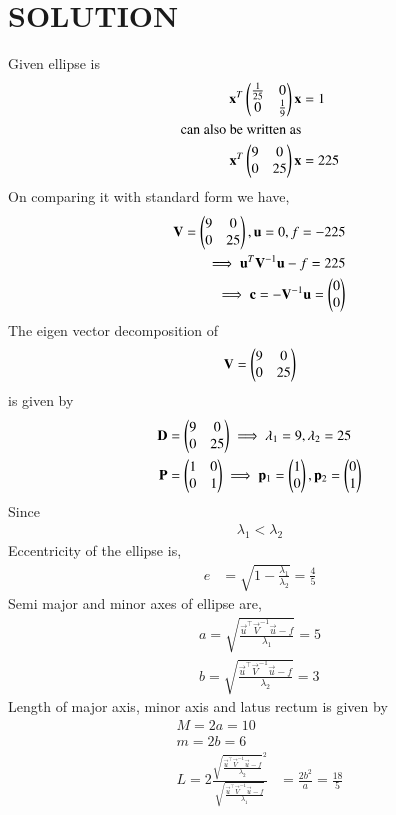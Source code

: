 \documentclass[journal,12pt,twocolumn]{IEEEtran}
\begin{document}
\section{SOLUTION}
%
Given ellipse is
\begin{align}
   \mathbf{x}^T\begin{pmatrix}\frac{1}{25}&0\\0&\frac{1}{9}\end{pmatrix}\mathbf{x}&=1\\
   \text{can also be written as}\\
   \mathbf{x}^T\begin{pmatrix}9&0\\0&25\end{pmatrix}\mathbf{x}&=225
\end{align}
%
On comparing it with standard form we have,
\begin{align}
    \mathbf{V}=\begin{pmatrix}9&0\\0&25\end{pmatrix},\mathbf{u}=0,f=-225\\
    \implies\mathbf{u}^T\mathbf{V}^{-1}\mathbf{u}-f = 225\\
    \implies\mathbf{c} = -\mathbf{V}^{-1}\mathbf{u} = \begin{pmatrix}0\\0\end{pmatrix}\\
\end{align}
The eigen vector decomposition of 
\begin{align}
    \mathbf{V} = \begin{pmatrix}9&0\\0&25\end{pmatrix}
\end{align}
is given by
\begin{align}
    \mathbf{D} &= \begin{pmatrix}9&0\\0&25\end{pmatrix} \implies \lambda_1 = 9,\lambda_2 = 25\\
    \mathbf{P} &= \begin{pmatrix}1&0\\0&1\end{pmatrix}\implies \mathbf{p}_1 = \begin{pmatrix}1\\0\end{pmatrix}, \mathbf{p}_2 = \begin{pmatrix}0\\1\end{pmatrix}
\end{align}
Since
\begin{align}
   \lambda_1 < \lambda_2
\end{align}
Eccentricity of the ellipse is,
\begin{align}
   e &= \sqrt{1-\frac{\lambda_1}{\lambda_2}}
   = \frac{4}{5}
\end{align} 
Semi major and minor axes of ellipse are,
\begin{align}
    a = \sqrt{\frac{\vec{u}^{\top}\vec{V}^{-1}\vec{u}-f}{\lambda_1}} = 5\\
    b = \sqrt{\frac{\vec{u}^{\top}\vec{V}^{-1}\vec{u}-f}{\lambda_2}} = 3
\end{align}
Length of major axis, minor axis and latus rectum is given by
\begin{align}
M = 2a = 10\\
m= 2b = 6\\
L =2\frac{{\sqrt{\frac{\vec{u}^{\top}\vec{V}^{-1}\vec{u}-f}{\lambda_2}}}^2}{\sqrt{\frac{\vec{u}^{\top}\vec{V}^{-1}\vec{u}-f}{\lambda_1}}}
&= \frac{2b^2}{a}= \frac{18}{5}
\end{align}
\end{document}
